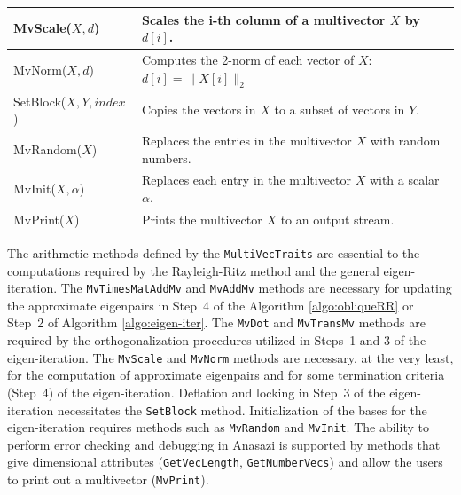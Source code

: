 \documentclass[acmtoms]{acmtrans2m}
\newcommand{\aspace}[1]{\texttt{#1}}
\begin{document}
\begin{table}
\begin{center}
\begin{tabular}{| p{4cm} | p{8cm} |}
MvScale($X,d$)    & Scales the i-th column of a multivector $X$ by $d[i]$. \\\hline

MvNorm($X,d$)     & Computes the 2-norm of each vector of
$X$: $d[i] = \|X[i]\|_2$  \\\hline

SetBlock($X,Y,index$) & Copies the vectors in $X$ to a subset of vectors in
$Y$. \\\hline

MvRandom($X$) & Replaces the entries in the multivector $X$ with random
numbers.  \\\hline

MvInit($X,\alpha$) & Replaces each entry in the multivector $X$ with a scalar $\alpha$.
\\\hline

MvPrint($X$)    & Prints the multivector $X$ to an output stream.
\\\hline 
\end{tabular}
\end{center}
\end{table}

The arithmetic methods defined by the \aspace{MultiVecTraits} are essential to the computations
required by the Rayleigh-Ritz method and the general eigen-iteration.  The 
\aspace{MvTimesMatAddMv} and \aspace{MvAddMv} methods are necessary for updating the approximate 
eigenpairs 
in Step~4 of the Algorithm \ref{algo:obliqueRR}
or Step~2 of Algorithm \ref{algo:eigen-iter}.
The \aspace{MvDot} and \aspace{MvTransMv} methods are required by the orthogonalization procedures
utilized in Steps~1 and 3 of the eigen-iteration.  The \aspace{MvScale} and \aspace{MvNorm}
methods are necessary, at the very least, for the computation of approximate eigenpairs and for  
some termination criteria (Step~4) of the eigen-iteration. 
Deflation and locking in Step~3 of the eigen-iteration necessitates the \aspace{SetBlock} method.
Initialization of the bases for the eigen-iteration requires
methods such as \aspace{MvRandom} and \aspace{MvInit}.
The ability to perform error checking and debugging in Anasazi is supported by methods that give 
dimensional attributes (\aspace{GetVecLength}, \aspace{GetNumberVecs}) and allow the users to print
out a multivector (\aspace{MvPrint}). 
\end{document}
